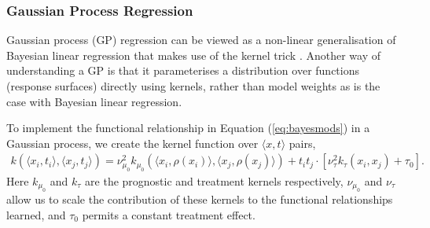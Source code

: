 \documentclass[12pt, a4paper]{article}
\begin{document}
\subsubsection*{Gaussian Process Regression}
\label{sub:gp}

Gaussian process (GP) regression can be viewed as a non-linear generalisation
of Bayesian linear regression that makes use of the kernel trick
\citep{williams2006, bishop2006}. Another way of understanding a GP is that it
parameterises a distribution over functions (response surfaces) directly using
kernels, rather than model weights as is the case with Bayesian linear
regression.

To implement the functional relationship in Equation (\ref{eq:bayesmods}) in a
Gaussian process, we create the kernel function over $\langle x, t \rangle$
pairs,
\begin{align*}
  k(\langle x_i, t_i \rangle, \langle x_j, t_j \rangle) 
    = \nu^2_{\mu_0} 
      k_{\mu_0}(\langle x_i, \rho(x_i) \rangle, \langle x_j, \rho(x_j) \rangle) 
    + t_i t_j \cdot [\nu^2_\tau k_\tau(x_i, x_j) + \tau_0].
\end{align*}
Here $k_{\mu_0}$ and $k_\tau$ are the prognostic and treatment kernels
respectively, $\nu_{\mu_0}$ and $\nu_\tau$ allow us to scale the
contribution of these kernels to the functional relationships learned, and
$\tau_0$ permits a constant treatment effect.
%
\end{document}
